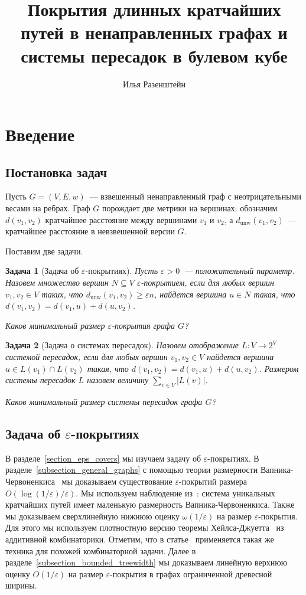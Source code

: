 \documentclass[12pt]{article}
\title{Покрытия длинных кратчайших путей в ненаправленных графах и системы пересадок в булевом кубе}
\author{Илья Разенштейн}
\newcommand{\eps}{\varepsilon}
\newcommand{\dunw}{d_{\mathrm{unw}}}
\newcommand{\abs}[1]{\left|#1\right|}
\newtheorem{problem}{Задача}
\begin{document}
    \maketitle
    \section{Введение}
    \subsection{Постановка задач}
    Пусть $G = (V, E, w)$~--- взвешенный ненаправленный граф с неотрицательными весами на ребрах.
    Граф $G$ порождает две метрики на вершинах: обозначим $d(v_1, v_2)$ кратчайшее расстояние между вершинами $v_1$
    и $v_2$, а $\dunw(v_1, v_2)$~--- кратчайшее расстояние в невзвешенной версии $G$.

    Поставим две задачи.
    \begin{problem}[Задача об $\eps$-покрытиях]
        Пусть $\eps > 0$~--- положительный параметр. Назовем множество вершин $N \subseteq V$ \emph{$\eps$-покрытием},
        если для любых вершин $v_1, v_2 \in V$ таких, что $\dunw(v_1, v_2) \geq \eps n$, найдется вершина $u \in N$
        такая, что $d(v_1, v_2) = d(v_1, u) + d(u, v_2)$.

        Каков минимальный размер $\eps$-покрытия графа $G$?
    \end{problem}
    \begin{problem}[Задача о системах пересадок]
        Назовем отображение $L \colon V \to 2^V$ \emph{системой пересадок}, если для любых вершин $v_1, v_2 \in V$
        найдется вершина $u \in L(v_1) \cap L(v_2)$ такая, что $d(v_1, v_2) = d(v_1, u) + d(u, v_2)$.
        \emph{Размером} системы пересадок $L$ назовем величину $\sum_{v \in V} \abs{L(v)}$. 

        Каков минимальный размер системы пересадок графа $G$?
    \end{problem}
    \subsection{Задача об $\eps$-покрытиях}
    В разделе~\ref{section_eps_covers} мы изучаем задачу об $\eps$-покрытиях.
    В разделе~\ref{subsection_general_graphs} с помощью теории размерности Вапника-Червоненкиса~\cite{VC71}
    мы доказываем существование $\eps$-покрытий размера $O(\log(1 / \eps) / \eps)$.
    Мы используем наблюдение из~\cite{ADFGW11}: система уникальных кратчайших путей имеет маленькую размерность
    Вапника-Червоненкиса.
    Также мы доказываем сверхлинейную нижнюю оценку $\omega(1 / \eps)$ на размер $\eps$-покрытия.
    Для этого мы используем плотностную версию теоремы Хейлса-Джуетта~\cite{P09} из аддитивной комбинаторики.
    Отметим, что в статье~\cite{A10} применяется такая же техника для похожей комбинаторной задачи.
    Далее в разделе~\ref{subsection_bounded_treewidth} мы доказываем линейную верхнюю оценку $O(1 / \eps)$
    на размер $\eps$-покрытия в графах ограниченной древесной ширины.
\end{document}
